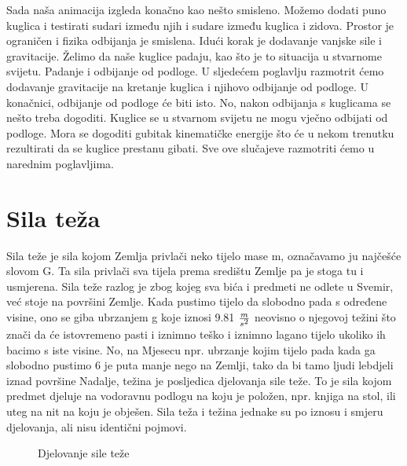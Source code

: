 Sada naša animacija izgleda konačno kao nešto smisleno. Možemo dodati puno kuglica i testirati sudari između njih i sudare između kuglica i zidova. Prostor je ograničen i fizika odbijanja je smislena. Idući korak je dodavanje vanjske sile i gravitacije. Želimo da naše kuglice padaju, kao što je to situacija u stvarnome svijetu. Padanje i odbijanje od podloge. U sljedećem poglavlju razmotrit ćemo dodavanje gravitacije na kretanje kuglica i njihovo odbijanje od podloge. U konačnici, odbijanje od podloge će biti isto. No, nakon odbijanja s kuglicama se nešto treba dogoditi. Kuglice se u stvarnom svijetu ne mogu vječno odbijati od podloge. Mora se dogoditi gubitak kinematičke energije što će u nekom trenutku rezultirati da se kuglice prestanu gibati. Sve ove slučajeve razmotriti ćemo u narednim poglavljima.\newpage

\section{Sila teža} 
Sila teže je sila kojom Zemlja privlači neko tijelo mase m, označavamo ju najčešće slovom G. Ta sila privlači sva tijela prema središtu Zemlje pa je stoga tu i usmjerena.
Sila teže razlog je zbog kojeg sva bića i predmeti ne odlete u Svemir, već stoje na površini Zemlje.
Kada pustimo tijelo da slobodno pada s određene visine, ono se giba ubrzanjem g koje iznosi 9.81 $\frac{m}{s\textsuperscript{2}}$ neovisno o njegovoj težini što znači da će istovremeno pasti i iznimno teško i iznimno lagano tijelo ukoliko ih bacimo s iste visine.
No, na Mjesecu npr. ubrzanje kojim tijelo pada kada ga slobodno pustimo 6 je puta manje nego na Zemlji, tako da bi tamo ljudi lebdjeli iznad površine 
Nadalje, težina je posljedica djelovanja sile teže. To je sila kojom predmet djeluje na vodoravnu podlogu na koju je položen, npr. knjiga na stol, ili uteg na nit na koju je obješen.
Sila teža i težina jednake su po iznosu i smjeru djelovanja, ali nisu identični pojmovi.


\begin{figure}[!http]
	\begin{center}
	\end{center}
	\caption {Djelovanje sile teže}
	\label{fig:22}
\end{figure}

